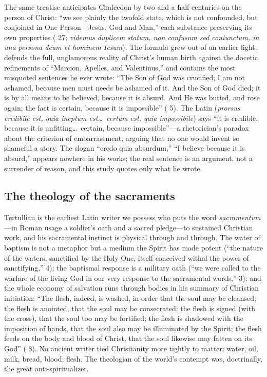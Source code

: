 The same treatise anticipates Chalcedon by two and a half centuries on the
person of Christ: ``we see plainly the twofold state, which is not confounded,
but conjoined in One Person---Jesus, God and Man,'' each substance preserving
its own properties ( 27; \textit{videmus duplicem
statum, non confusum sed coniunctum, in una persona deum et hominem Iesum}).
The formula grew out of an earlier fight. 
defends the full, unglamorous reality of Christ's human birth against the
docetic refinements of ``Marcion, Apelles, and Valentinus,'' and contains the
most misquoted sentences he ever wrote: ``The Son of God was crucified; I am
not ashamed, because men must needs be ashamed of it. And the Son of God died;
it is by all means to be believed, because it is absurd. And He was buried,
and rose again; the fact is certain, because it is impossible'' ( 5). The Latin (\textit{prorsus credibile est, quia ineptum
est\ldots\ certum est, quia impossibile}) says ``it is credible, because it is
unfitting\ldots\ certain, because impossible''---a rhetorician's paradox
about the criterion of embarrassment, arguing that no one would invent so
shameful a story. The slogan ``credo quia absurdum,'' ``I believe because it
is absurd,'' appears nowhere in his works; the real sentence is an argument,
not a surrender of reason, and this study quotes only what he wrote.

\subsection{The theology of the sacraments}

Tertullian is the earliest Latin writer we possess who puts the word
\textit{sacramentum}---in Roman usage a soldier's oath and a sacred
pledge---to sustained Christian work, and his sacramental instinct is
physical through and through. The water of baptism is not a metaphor
but a medium the Spirit has made potent (``the nature of the waters,
sanctified by the Holy One, itself conceived withal the power of
sanctifying,''  4); the baptismal response is a military
oath (``we were called to the warfare of the living God in our very response
to the sacramental words,''  3); and the whole economy
of salvation runs through bodies in his summary of Christian initiation:
``The flesh, indeed, is washed, in order that the soul may be cleansed; the
flesh is anointed, that the soul may be consecrated; the flesh is signed
(with the cross), that the soul too may be fortified; the flesh is shadowed
with the imposition of hands, that the soul also may be illuminated by the
Spirit; the flesh feeds on the body and blood of Christ, that the soul
likewise may fatten on its God'' ( 8).
No ancient writer tied Christianity more tightly to matter: water, oil, milk,
bread, blood, flesh. The theologian of the world's contempt was, doctrinally,
the great anti-spiritualizer.

